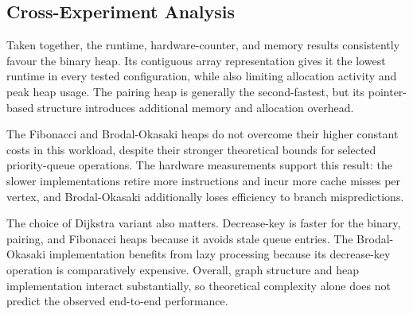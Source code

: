 \subsection{Cross-Experiment Analysis}

Taken together, the runtime, hardware-counter, and memory results consistently
favour the binary heap. Its contiguous array representation gives it the
lowest runtime in every tested configuration, while also limiting allocation
activity and peak heap usage. The pairing heap is generally the second-fastest,
but its pointer-based structure introduces additional memory and allocation
overhead.

The Fibonacci and Brodal-Okasaki heaps do not overcome their higher constant
costs in this workload, despite their stronger theoretical bounds for selected
priority-queue operations. The hardware measurements support this result:
the slower implementations retire more instructions and incur more cache
misses per vertex, and Brodal-Okasaki additionally loses efficiency to branch
mispredictions.

The choice of Dijkstra variant also matters. Decrease-key is faster for the
binary, pairing, and Fibonacci heaps because it avoids stale queue entries.
The Brodal-Okasaki implementation benefits from lazy processing because its
decrease-key operation is comparatively expensive. Overall, graph structure
and heap implementation interact substantially, so theoretical complexity
alone does not predict the observed end-to-end performance.